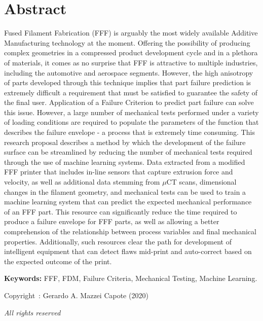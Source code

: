 \documentclass[main.tex]{subfiles}
\begin{document}
\setcounter{page}{1}
\chapter*{Abstract}
Fused Filament Fabrication (FFF) is arguably the most widely available Additive Manufacturing technology at the moment. Offering the possibility of producing complex geometries in a compressed product development cycle and in a plethora of materials, it comes as no surprise that FFF is attractive to multiple industries, including the automotive and aerospace segments. However, the high anisotropy of parts developed through this technique implies that part failure prediction is extremely difficult \textemdash a requirement that must be satisfied to guarantee the safety of the final user. Application of a Failure Criterion to predict part failure can solve this issue. However, a large number of mechanical tests performed under a variety of loading conditions are required to populate the parameters of the function that describes the failure envelope - a process that is extremely time consuming. This research proposal describes a method by which the development of the failure surface can be streamlined by reducing the number of mechanical tests required through the use of machine learning systems. Data extracted from a modified FFF printer that includes in-line sensors that capture extrusion force and velocity, as well as additional data stemming from $\mu$CT scans, dimensional changes in the filament geometry, and mechanical tests can be used to train a machine learning system that can predict the expected mechanical performance of an FFF part. This resource can significantly reduce the time required to produce a failure envelope for FFF parts, as well as allowing a better comprehension of the relationship between process variables and final mechanical properties. Additionally, such resources clear the path for development of intelligent equipment that can detect flaws mid-print and auto-correct based on the expected outcome of the print.  
 
\vspace{10mm} %
\textbf{Keywords:} FFF, FDM, Failure Criteria, Mechanical Testing, Machine Learning.

\vfill %
\begin{center}
Copyright~\textcopyright: Gerardo A. Mazzei Capote (2020)

\emph{All rights reserved}	
\end{center}
\end{document}
